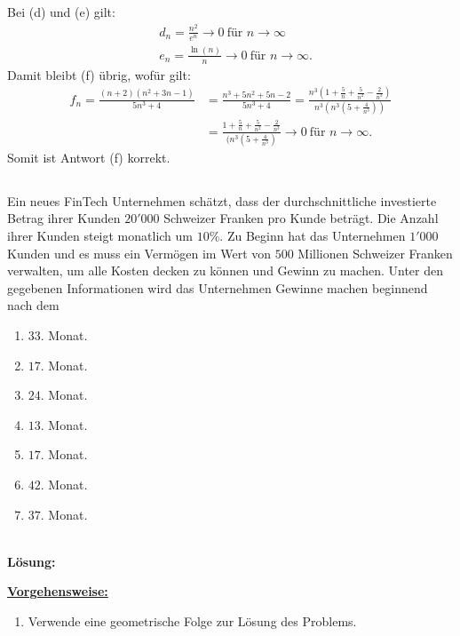 Bei (d) und (e) gilt:
\begin{align*}
	&d_n = \frac{n^2}{ e^n} \to 0  \ \textrm{für } n \to \infty\\
	&e_n = \frac{\ln(n)}{n} \to 0 \ \textrm{für } n \to \infty.
\end{align*}
Damit bleibt (f) übrig, wofür gilt:
\begin{align*}
	f_n = \frac{(n+2) (n^2 + 3n -1 )}{5n^3 + 4}
	&=
	\frac{n^3 + 5n^2 + 5n - 2}{5n^3 + 4}
	=
	\frac{n^3 \left(1 + \frac{5}{n} + \frac{5}{n^2}  - \frac{2}{n^3}\right)}{n^3 \left(n^3 ( 5 + \frac{4}{n^3}) \right)}\\
	&=
	\frac{1 + \frac{5}{n} + \frac{5}{n^2}  - \frac{2}{n^3}}{(n^3 ( 5 + \frac{4}{n^3})}
	\to 0 \ \textrm{für } n \to \infty.
\end{align*}
Somit ist Antwort (f) korrekt.
\newpage

\subsection*{}
Ein neues FinTech Unternehmen schätzt, dass der durchschnittliche investierte Betrag ihrer Kunden $20'000$ Schweizer Franken pro Kunde beträgt.
Die Anzahl ihrer Kunden steigt monatlich um $10 \% $. Zu Beginn hat das Unternehmen $1'000$ Kunden und es muss ein Vermögen im Wert von $500$ Millionen Schweizer Franken verwalten, um alle Kosten decken zu können und Gewinn zu machen.
Unter den gegebenen Informationen wird das Unternehmen Gewinne machen beginnend nach dem
\renewcommand{\labelenumi}{(\alph{enumi})}
\begin{enumerate}
	\item 
	$33$. Monat.
	\item
	$17$. Monat.
	\item
	$24$. Monat.
	\item
	$13$. Monat.
	\item
	$17$. Monat.
	\item
	$42$. Monat.
	\item
	$37$. Monat.
\end{enumerate}
\ \\
\textbf{Lösung:}
\begin{mdframed}
\underline{\textbf{Vorgehensweise:}}
\renewcommand{\labelenumi}{\theenumi.}
\begin{enumerate}
\item Verwende eine geometrische Folge zur Lösung des Problems.
\end{enumerate}
\end{mdframed}

